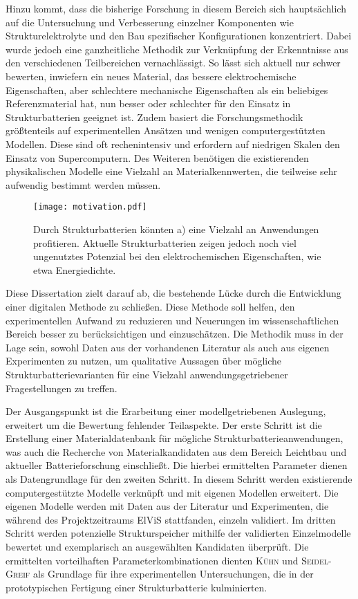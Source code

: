 Hinzu kommt, dass die bisherige Forschung in diesem Bereich sich hauptsächlich auf die Untersuchung und Verbesserung einzelner Komponenten wie Strukturelektrolyte und den Bau spezifischer Konfigurationen konzentriert. Dabei wurde jedoch eine ganzheitliche Methodik zur Verknüpfung der Erkenntnisse aus den verschiedenen Teilbereichen vernachlässigt. So lässt sich aktuell nur schwer bewerten, inwiefern ein neues Material, das bessere elektrochemische Eigenschaften, aber schlechtere mechanische Eigenschaften als ein beliebiges Referenzmaterial hat, nun besser oder schlechter für den Einsatz in Strukturbatterien geeignet ist. Zudem basiert die Forschungsmethodik größtenteils auf experimentellen Ansätzen und wenigen computergestützten Modellen. Diese sind oft rechenintensiv und erfordern auf niedrigen Skalen den Einsatz von Supercomputern. Des Weiteren benötigen die existierenden physikalischen Modelle eine Vielzahl an Materialkennwerten, die teilweise sehr aufwendig bestimmt werden müssen.

\begin{figure}[h]
        \center
	\texttt{[image: motivation.pdf]}
		\caption{\label{fig:motivation} Durch Strukturbatterien könnten a) eine Vielzahl an Anwendungen profitieren. Aktuelle Strukturbatterien zeigen jedoch noch viel ungenutztes Potenzial bei den elektrochemischen Eigenschaften, wie etwa Energiedichte.}
\end{figure}

Diese Dissertation zielt darauf ab, die bestehende Lücke durch die Entwicklung einer digitalen Methode zu schließen. Diese Methode soll helfen, den experimentellen Aufwand zu reduzieren und Neuerungen im wissenschaftlichen Bereich besser zu berücksichtigen und einzuschätzen. Die Methodik muss in der Lage sein, sowohl Daten aus der vorhandenen Literatur als auch aus eigenen Experimenten zu nutzen, um qualitative Aussagen über mögliche Strukturbatterievarianten für eine Vielzahl anwendungsgetriebener Fragestellungen zu treffen.

Der Ausgangspunkt ist die Erarbeitung einer modellgetriebenen Auslegung, erweitert um die Bewertung fehlender Teilaspekte. Der erste Schritt ist die Erstellung einer Materialdatenbank für mögliche Strukturbatterieanwendungen, was auch die Recherche von Materialkandidaten aus dem Bereich Leichtbau und aktueller Batterieforschung einschließt. Die hierbei ermittelten Parameter dienen als Datengrundlage für den zweiten Schritt. In diesem Schritt werden existierende computergestützte Modelle verknüpft und mit eigenen Modellen erweitert. Die eigenen Modelle werden mit Daten aus der Literatur und Experimenten, die während des Projektzeitraums ElViS stattfanden, einzeln validiert. Im dritten Schritt werden potenzielle Strukturspeicher mithilfe der validierten Einzelmodelle bewertet und exemplarisch an ausgewählten Kandidaten überprüft. Die ermittelten vorteilhaften Parameterkombinationen dienten \textsc{Kühn} und \textsc{Seidel-Greif} als Grundlage für ihre experimentellen Untersuchungen, die in der prototypischen Fertigung einer Strukturbatterie kulminierten.

